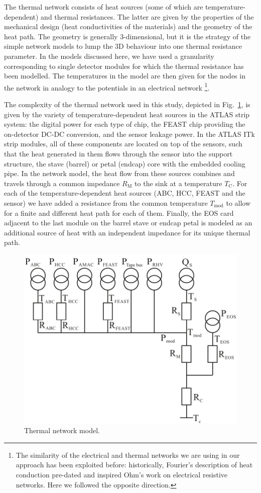The thermal network consists of heat sources (some of which are temperature-dependent) and thermal resistances. The latter are given by the properties of the mechanical design (heat conductivities of the materials) and the geometry of the heat path. The geometry is generally 3-dimensional, but it is the strategy of the simple network models to lump the 3D behaviour into one thermal resistance parameter. In the models discussed here, we have used a granularity corresponding to single detector modules for which the thermal resistance has been modelled. The temperatures in the model are then given for the nodes in the network in analogy to the potentials in an electrical network \footnote{The similarity of the electrical and thermal networks we are using in our approach has been exploited before: historically, Fourier's description of heat conduction pre-dated and inspired Ohm's work on electrical resistive networks. Here we followed the opposite direction.}.

The complexity of the thermal network used in this study, depicted in Fig.~\ref{fig:thermalmodel}, is given by the variety of temperature-dependent heat sources in the ATLAS strip system: the digital power for each type of chip, the FEAST chip providing the on-detector DC-DC conversion, and the sensor leakage power. In the ATLAS ITk strip modules, all of these components are located on top of the sensors, such that the heat generated in them flows through the sensor into the support structure, the stave (barrel) or petal (endcap) core with the embedded cooling pipe. In the network model, the heat flow from these sources combines and travels through a common impedance $R_\text{M}$ to the sink at a temperature $T_\text{C}$. For each of the temperature-dependent heat sources (ABC, HCC, FEAST and the sensor) we have added a resistance from the common temperature $T_\text{mod}$ to allow for a finite and different heat path for each of them. Finally, the EOS card adjacent to the last module on the barrel stave or endcap petal is modeled as an additional source of heat with an independent impedance for its unique thermal path.

\begin{figure}[ht]
\centering
\includegraphics[width=0.6\linewidth]{figures/Thermalmodel.pdf}
\caption{Thermal network model.}
\label{fig:thermalmodel}
\end{figure}

